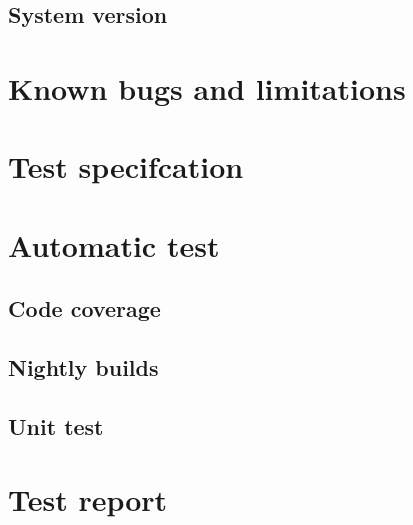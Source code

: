 \documentclass[a4paper,titlepage]{article}
\begin{document}
\subsection{System version}

\section{Known bugs and limitations}

\section{Test specifcation}

\section{Automatic test}
\subsection{Code coverage}

\subsection{Nightly builds}

\subsection{Unit test}


\section{Test report}

\end{document}
